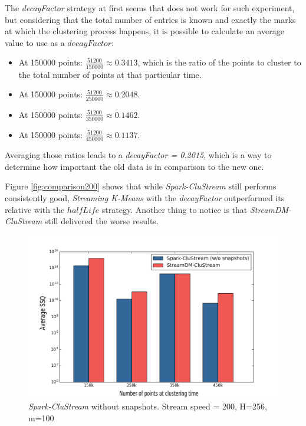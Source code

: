 The \textit{decayFactor} strategy at first seems that does not work for such experiment, but considering that the total number of entries is known and exactly the marks at which the clustering process happens, it is possible to calculate an average value to use as a $decayFactor$: 

\begin{itemize}
 \item At 150000 points: $\frac{51200}{150000} \approx 0.3413$, which is the ratio of the points to cluster to the total number of points at that particular time.
 \item At 150000 points: $\frac{51200}{250000} \approx 0.2048$.
 \item At 150000 points: $\frac{51200}{350000} \approx 0.1462$.
 \item At 150000 points: $\frac{51200}{450000} \approx 0.1137$.
\end{itemize}

Averaging those ratios leads to a \textit{decayFactor = 0.2015}, which is a way to determine how important the old data is in comparison to the new one.


Figure \ref{fig:comparison200} shows that while \textit{Spark-CluStream} still performs consistently good, \textit{Streaming K-Means} with the \textit{decayFactor} outperformed its relative with the $halfLife$ strategy. Another thing to notice is that \textit{StreamDM-CluStream} still delivered the worse results. 

\begin{figure}[h]
 \centering
 \includegraphics[scale=0.4]{./styles/comparisonNoSnaps2.png}
 \caption{\textit{Spark-CluStream} without snapshots. Stream speed = 200, H=256, m=100}
 \label{fig:comparisonNoSnaps2}
\end{figure}

